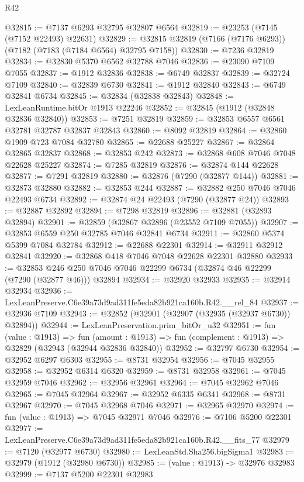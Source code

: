 \begin{lexlean}{R42}
\begin{coremodule}
{@32815 := @7137 @6293 @32795 @32807 @6564
@32819 := @23253 (@7145 (@7152 @22493) @22631)
@32829 := @32815 @32819 (@7166 (@7176 @6293)) (@7182 (@7183 (@7184 @6564) @32795 @7158))
@32830 := @7236 @32819
@32834 := @32830 @5370 @6562 @32788 @7046
@32836 := @23090 @7109 @7055
@32837 := @1912 @32836
@32838 := @6749 @32837
@32839 := @32724 @7109
@32840 := @32839 @6730
@32841 := @1912 @32840
@32843 := @6749 @32841 @6734
@32845 := @32834 (@32838 @32843)
@32848 := LexLeanRuntime.bitOr @1913 @22246
@32852 := @32845 (@1912 (@32848 @32836 @32840))
@32853 := @7251 @32819
@32859 := @32853 @6557 @6561 @32781 @32787 @32837 @32843
@32860 := @8092 @32819
@32864 := @32860 @1909 @723 @7084 @32780
@32865 := @22688 @25227
@32867 := @32864 @32865 @32837
@32868 := @32853 @242
@32873 := @32868 @608 @7046 @7048 @22628 @25227
@32874 := @7285 @32819
@32876 := @32874 @144 @22628
@32877 := @7291 @32819
@32880 := @32876 (@7290 (@32877 @144))
@32881 := @32873 @32880
@32882 := @32853 @244
@32887 := @32882 @250 @7046 @7046 @22493 @6734
@32892 := @32874 @24 @22493 (@7290 (@32877 @24))
@32893 := @32887 @32892
@32894 := @7298 @32819
@32896 := @32881 (@32893 @32894)
@32901 := @32859 (@32867 @32896 (@23552 @7109 @7055))
@32907 := @32853 @6559 @250 @32785 @7046 @32841 @6734
@32911 := @32860 @5374 @5399 @7084 @32784
@32912 := @22688 @22301
@32914 := @32911 @32912 @32841
@32920 := @32868 @418 @7046 @7048 @22628 @22301 @32880
@32933 := @32853 @246 @250 @7046 @7046 @22299 @6734 (@32874 @46 @22299 (@7290 (@32877 @46))) @32894
@32934 := @32920 @32933
@32935 := @32914 @32934
@32936 := LexLeanPreserve.C6e39a73d9ad311fe5eda82b921ca160b.R42.__rel_84
@32937 := @32936 @7109
@32943 := @32852 (@32901 (@32907 (@32935 (@32937 @6730)) @32894))
@32944 := LexLeanPreservation.prim_bitOr_u32
@32951 := fun (value : @1913) =>
  fun (amount : @1913) => fun (complement : @1913) => @32829 (@32943 (@32944 @32836 @32840))
@32952 := @32797 @6730
@32954 := @32952 @6297 @6303
@32955 := @8731 @32954
@32956 := @7045 @32955
@32958 := @32952 @6314 @6320
@32959 := @8731 @32958
@32961 := @7045 @32959 @7046
@32962 := @32956 @32961
@32964 := @7045 @32962 @7046
@32965 := @7045 @32964
@32967 := @32952 @6335 @6341
@32968 := @8731 @32967
@32970 := @7045 @32968 @7046
@32971 := @32965 @32970
@32974 := fun (value : @1913) => @7045 @32971 @7046
@32976 := @7106 @5200 @22301
@32977 := LexLeanPreserve.C6e39a73d9ad311fe5eda82b921ca160b.R42.__fits_77
@32979 := @7120 (@32977 @6730)
@32980 := LexLeanStd.Sha256.bigSigma1
@32983 := @32979 (@1912 (@32980 @6730))
@32985 := (value : @1913) -> @32976 @32983
@32999 := @7137
    @5200
    @22301
    @32983
}
\end{coremodule}
\end{lexlean}
